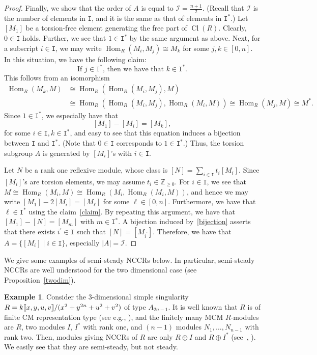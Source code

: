 \documentclass[11pt]{amsart}
\theoremstyle{definition}
\newtheorem{exem}[theo]{Example}
\newcommand{\calI}{\mathcal{I}}
\newcommand{\ZZ}{\mathbb{Z}}
\newcommand{\ttI}{\mathtt{I}}
\DeclareMathOperator{\Hom}{Hom}
\DeclareMathOperator{\Cl}{Cl}
\newcommand{\llbracket}{\mathopen{[\mkern -2.7mu[}}
\newcommand{\rrbracket}{\mathclose{]\mkern -2.7mu]}}
\begin{document}
\begin{proof}
Finally, we show that the order of $A$ is equal to $\calI=\frac{n+1}{2}$. (Recall that $\calI$ is the number of elements in $\ttI$, and it is the same as that of elements in $\ttI^*$.) Let $[M_1]$ be a torsion-free element generating the free part of $\Cl(R)$. Clearly, $0\in \ttI$ holds. Further, we see that $1\in\ttI^*$ by the same argument as above. Next, for a subscript $i\in\ttI$, we may write $\Hom_R(M_i,M_j)\cong M_k$ for some $j, k\in[0,n]$. In this situation, we have the following claim:
\begin{equation}\label{claim}
\text{If $j\in\ttI^*$, then we have that $k\in\ttI^*$}.
\end{equation}
This follows from an isomorphism
\begin{equation*}
\begin{split}
\Hom_R(M_k,M)&\cong\Hom_R(\Hom_R(M_i,M_j),M) \\
&\cong\Hom_R(\Hom_R(M_i,M_j),\Hom_R(M_i,M))\cong\Hom_R(M_j,M)\cong M^*.
\end{split}
\end{equation*}
Since $1\in\ttI^*$, we especially have that
\begin{equation}\label{bijection}
[M_1]-[M_i]=[M_k],
\end{equation}
for some $i\in\ttI, k\in\ttI^*$, and easy to see that this equation induces a bijection between $\ttI$ and $\ttI^*$. (Note that $0\in\ttI$ corresponds to $1\in\ttI^*$.) Thus, the torsion subgroup $A$ is generated by $[M_i]$'s with $i\in\ttI$.

Let $N$ be a rank one reflexive module, whose class is $[N]=\sum_{i\in\ttI}t_i[M_i]$. Since $[M_i]$'s are torsion elements, we may assume $t_i\in\ZZ_{\ge0}$. For $i\in\ttI$, we see that $M\cong\Hom_R(M_i,M)\cong\Hom_R(M_i,\Hom_R(M_i,M))$, and hence we may write $[M_1]-2[M_i]=[M_\ell]$ for some $\ell\in[0,n]$. Furthermore, we have that $\ell\in\ttI^*$ using the claim~\eqref{claim}. By repeating this argument, we have that $[M_1]-[N]=[M_m]$ with $m\in\ttI^*$. A bijection induced by~\eqref{bijection} asserts that there exists $i^\prime\in\ttI$ such that $[N]=[M_{i^\prime}]$. Therefore, we have that $A=\{[M_i] \mid i\in\ttI \}$, especially $|A|=\calI$.
\end{proof}

We give some examples of semi-steady NCCRs below. In particular, semi-steady NCCRs are well understood for the two dimensional case (see Proposition~\ref{twodim}).

\begin{exem}\label{ex_Ansing}
Consider the $3$-dimensional simple singularity $R=k\llbracket x,y,u,v\rrbracket /(x^2+y^{2n}+u^2+v^2)$ of type $A_{2n-1}$. It is well known that $R$ is of finite CM representation type (see e.g., \cite[Chapter~12]{Yos}), and the finitely many MCM $R$-modules are $R$, two modules $I$, $I^*$ with rank one, and $(n-1)$ modules $N_1,\dots,N_{n-1}$ with rank two. Then, modules giving NCCRs of $R$ are only $R\oplus I$ and $R\oplus I^*$ (see~\cite[Proposition~2.4]{BIKR}, \cite[Example~3.6]{Dao}). We easily see that they are semi-steady, but not steady.
\end{exem}
\end{document}
